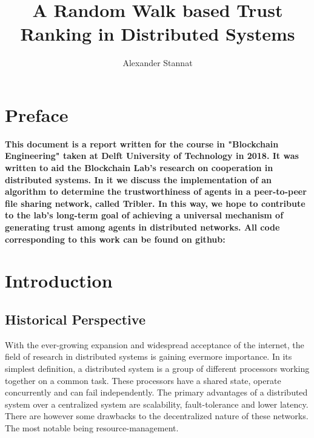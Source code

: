 \documentclass[sigconf]{acmart}
\theoremstyle{definition}
\begin{document}
\title{A Random Walk based Trust Ranking in Distributed Systems}
\author{Alexander Stannat}

\maketitle
{}
\section*{Preface}
{\bf
This document is a report written for the course in "Blockchain Engineering" taken at Delft University of Technology in 2018. It was written to aid the Blockchain Lab's research on cooperation in distributed systems. In it we discuss the implementation of an algorithm to determine the trustworthiness of agents in a peer-to-peer file sharing network, called Tribler. In this way, we hope to contribute to the lab's long-term goal of achieving a universal mechanism of generating trust among agents in distributed networks. All code corresponding to this work can be found on github: }

\tableofcontents
\section{Introduction}
\label{sec:Introduction}
\subsection{Historical Perspective}
\label{subsec:HistoricalPerspective}
With the ever-growing expansion and widespread acceptance of the internet, the field of research in distributed systems is gaining evermore importance. In its simplest definition, a distributed system is a group of different processors working together on a common task. These processors have a shared state, operate concurrently and can fail independently. The primary advantages of a distributed system over a centralized system are scalability, fault-tolerance and lower latency. There are however some drawbacks to the decentralized nature of these networks. The most notable being resource-management.\vspace{1em}\\
\end{document}

